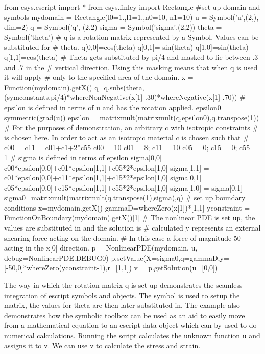 \begin{python}
from esys.escript import *
from esys.finley import Rectangle
#set up domain and symbols
mydomain = Rectangle(l0=1.,l1=1.,n0=10, n1=10)
u = Symbol('u',(2,), dim=2)
q = Symbol('q', (2,2)
sigma = Symbol('sigma',(2,2))
theta = Symbol('theta')
# q is a rotation matrix represented by a Symbol. Values can be substituted for 
# theta.
q[0,0]=cos(theta)
q[0,1]=-sin(theta)
q[1,0]=sin(theta)
q[1,1]=cos(theta)
# Theta gets substituted by pi/4 and masked to lie between .3 and .7 in the 
# vertical direction. Using this masking means that when q is used it will apply
# only to the specified area of the domain. 
x = Function(mydomain).getX()
q=q.subs(theta,(symconstants.pi/4)*whereNonNegative(x[1]-.30)*whereNegative(x[1]-.70))
# epsilon is defined in terms of u and has the rotation applied. 
epsilon0 = symmetric(grad(u))
epsilon = matrixmult(matrixmult(q,epsilon0),q.transpose(1))
# For the purposes of demonstration, an arbitrary c with isotropic constraints 
# is chosen here. In order to act as an isotropic material c is chosen such that 
# c00 = c11 = c01+c1+2*c55
c00 = 10
c01 = 8; c11 = 10
c05 = 0; c15 = 0; c55 = 1
# sigma is defined in terms of epsilon
sigma[0,0] = c00*epsilon[0,0]+c01*epsilon[1,1]+c05*2*epsilon[1,0]
sigma[1,1] = c01*epsilon[0,0]+c11*epsilon[1,1]+c15*2*epsilon[1,0]
sigma[0,1] = c05*epsilon[0,0]+c15*epsilon[1,1]+c55*2*epsilon[1,0]
sigma[1,0] = sigma[0,1]
sigma0=matrixmult(matrixmult(q.transpose(1),sigma),q)
# set up boundary conditions
x=mydomain.getX()
gammaD=whereZero(x[1])*[1,1]
yconstraint = FunctionOnBoundary(mydomain).getX()[1]
# The nonlinear PDE is set up, the values are substituted in and the solution is
# calculated y represents an external shearing force acting on the domain. 
# In this case a force of magnitude 50 acting in the x[0] direction.
p = NonlinearPDE(mydomain, u, debug=NonlinearPDE.DEBUG0)
p.setValue(X=sigma0,q=gammaD,y=[-50,0]*whereZero(yconstraint-1),r=[1,1])
v = p.getSolution(u=[0,0])
\end{python}
The way in which the rotation matrix q is set up demonstrates the seamless integration of escript symbols and \Data objects. The symbol is used to setup the matrix, the values for theta are then later substituted in. The example also demonstrates how the symbolic toolbox can be used as an aid to easily move from a mathematical equation to an escript data object which can by used to do numerical calculations. 
Running the script calculates the unknown function u and assigns it to v. We can use v to calculate the stress and strain.  
